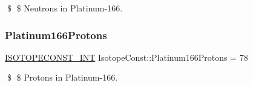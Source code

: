 \$ \$ Neutrons in Platinum-\/166. \mbox{\label{group___isotope_const-_platinum-_pt166_ga44765e957a3a206359ea0cb2b065d16b}} 
\subsubsection{\texorpdfstring{Platinum166\+Protons}{Platinum166Protons}}
{\footnotesize\ttfamily \mbox{\hyperlink{group___isotope_const-_macros_ga5f18360b3e99483a35c32d789e62621c}{I\+S\+O\+T\+O\+P\+E\+C\+O\+N\+S\+T\+\_\+\+I\+NT}} Isotope\+Const\+::\+Platinum166\+Protons = 78}

\$ \$ Protons in Platinum-\/166. 